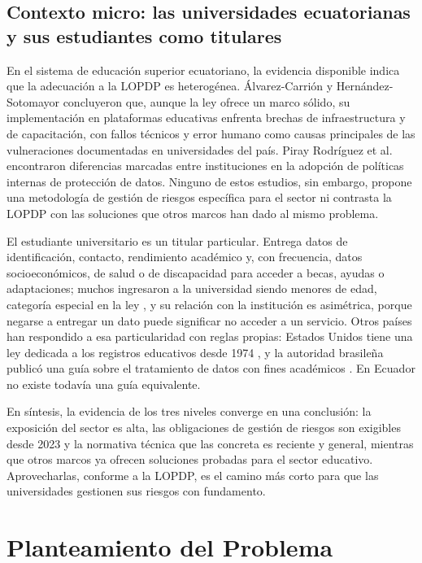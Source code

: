 \subsection{Contexto micro: las universidades ecuatorianas y sus estudiantes como titulares}

En el sistema de educación superior ecuatoriano, la evidencia disponible indica que la adecuación a la LOPDP es heterogénea. Álvarez-Carrión y Hernández-Sotomayor \cite{alvarez2024proteccion} concluyeron que, aunque la ley ofrece un marco sólido, su implementación en plataformas educativas enfrenta brechas de infraestructura y de capacitación, con fallos técnicos y error humano como causas principales de las vulneraciones documentadas en universidades del país. Piray Rodríguez et al. \cite{piray2026garantias} encontraron diferencias marcadas entre instituciones en la adopción de políticas internas de protección de datos. Ninguno de estos estudios, sin embargo, propone una metodología de gestión de riesgos específica para el sector ni contrasta la LOPDP con las soluciones que otros marcos han dado al mismo problema.

El estudiante universitario es un titular particular. Entrega datos de identificación, contacto, rendimiento académico y, con frecuencia, datos socioeconómicos, de salud o de discapacidad para acceder a becas, ayudas o adaptaciones; muchos ingresaron a la universidad siendo menores de edad, categoría especial en la ley \cite[art.~25]{lopdp2021}, y su relación con la institución es asimétrica, porque negarse a entregar un dato puede significar no acceder a un servicio. Otros países han respondido a esa particularidad con reglas propias: Estados Unidos tiene una ley dedicada a los registros educativos desde 1974 \cite{ferpa1974}, y la autoridad brasileña publicó una guía sobre el tratamiento de datos con fines académicos \cite{anpd2023academicos}. En Ecuador no existe todavía una guía equivalente.

En síntesis, la evidencia de los tres niveles converge en una conclusión: la exposición del sector es alta, las obligaciones de gestión de riesgos son exigibles desde 2023 y la normativa técnica que las concreta es reciente y general, mientras que otros marcos ya ofrecen soluciones probadas para el sector educativo. Aprovecharlas, conforme a la LOPDP, es el camino más corto para que las universidades gestionen sus riesgos con fundamento.

\section{Planteamiento del Problema}

